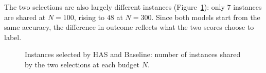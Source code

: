 The two selections are also largely different instances
(Figure~\ref{fig:same_instances}): only $7$ instances are shared at $N=100$,
rising to $48$ at $N=300$. Since both models start from the same accuracy,
the difference in outcome reflects what the two scores choose to label.

\begin{figure}[ht]
    \centering
    \resizebox{0.8\textwidth}{!}{}
    \caption{Instances selected by HAS and Baseline: number of instances
    shared by the two selections at each budget $N$.}
    \label{fig:same_instances}
\end{figure}
